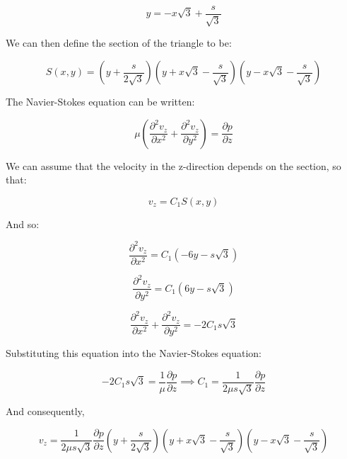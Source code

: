 \begin{equation}
y = -x\sqrt{3} + \frac{s}{\sqrt{3}}
\end{equation}

We can then define the section of the triangle to be:

\begin{equation}
S(x,y) = \left( y + \frac{s}{2\sqrt{3}} \right) \left( y + x\sqrt{3} - \frac{s}{\sqrt{3}} \right) \left( y - x\sqrt{3} - \frac{s}{\sqrt{3}} \right)
\end{equation}

The Navier-Stokes equation can be written:

\begin{equation}
\mu \left( \frac{\partial^2 v_z}{\partial x^2} + \frac{\partial^2 v_z}{\partial y^2} \right) = \frac{\partial p}{\partial z}
\end{equation}

We can assume that the velocity in the z-direction depends on the section, so that:

\begin{equation}
v_z = C_1 S(x,y)
\end{equation}

And so:

\begin{equation}
\frac{\partial^2 v_z}{\partial x^2} = C_1 (-6y - s\sqrt{3})
\end{equation}

\begin{equation}
\frac{\partial^2 v_z}{\partial y^2} = C_1 (6y - s\sqrt{3})
\end{equation}


\begin{equation}
\frac{\partial^2 v_z}{\partial x^2} + \frac{\partial^2 v_z}{\partial y^2} = - 2 C_1 s\sqrt{3}
\end{equation}

Substituting this equation into the Navier-Stokes equation:


\begin{equation}
- 2 C_1 s\sqrt{3} = \frac{1}{\mu}\frac{\partial p}{\partial z} \implies C_1 = \frac{1}{2\mu s\sqrt{3}}\frac{\partial p}{\partial z}
\end{equation}

And consequently,


\begin{equation}
v_z = \frac{1}{2\mu s\sqrt{3}}\frac{\partial p}{\partial z} \left( y + \frac{s}{2\sqrt{3}} \right) \left( y + x\sqrt{3} - \frac{s}{\sqrt{3}} \right) \left( y - x\sqrt{3} - \frac{s}{\sqrt{3}} \right)
\end{equation}

